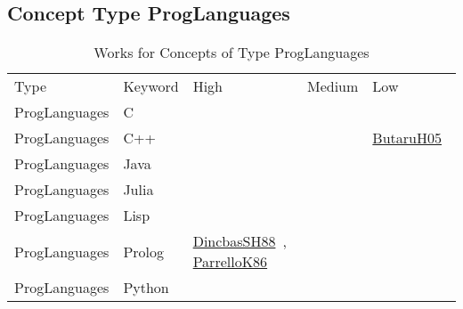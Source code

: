 \clearpage
\subsection{Concept Type ProgLanguages}
\label{sec:ProgLanguages}
{\scriptsize
\begin{longtable}{lp{3cm}>{\raggedright\arraybackslash}p{6cm}>{\raggedright\arraybackslash}p{6cm}>{\raggedright\arraybackslash}p{8cm}}
\rowcolor{white}\caption{Works for Concepts of Type ProgLanguages}\\ \toprule
\rowcolor{white}Type & Keyword & High & Medium & Low\\ \midrule\endhead
\bottomrule
\endfoot
ProgLanguages & C  &  &  & \\
ProgLanguages & C++ &  &  & \href{cars/works/ButaruH05.pdf}{ButaruH05}~\cite{ButaruH05}\\
ProgLanguages & Java &  &  & \\
ProgLanguages & Julia &  &  & \\
ProgLanguages & Lisp &  &  & \\
ProgLanguages & Prolog & \href{cars/works/DincbasSH88.pdf}{DincbasSH88}~\cite{DincbasSH88}, \href{cars/works/ParrelloK86.pdf}{ParrelloK86}~\cite{ParrelloK86} &  & \\
ProgLanguages & Python &  &  & \\
\end{longtable}
}

